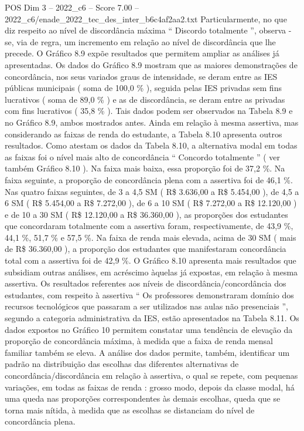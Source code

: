 \begin{textsample}{POS Dim 3 – 2022\_c6 – Score 7.00 – 2022\_c6/enade\_2022\_tec\_des\_inter\_b6c4af2aa2.txt}
Particularmente, no que diz respeito ao nível de discordância máxima “ Discordo totalmente ”, observa -se, via de regra, um incremento em relação ao nível de discordância que lhe precede.
O Gráfico 8.9 expõe resultados que permitem ampliar as análises já apresentadas.
Os dados do Gráfico 8.9 mostram que as maiores demonstrações de concordância, nos seus variados graus de intensidade, se deram entre as IES públicas municipais ( soma de 100,0 \% ), seguida pelas IES privadas sem fins lucrativos ( soma de 89,0 \% ) e as de discordância, se deram entre as privadas com fins lucrativos ( 35,8 \% ).
Tais dados podem ser observados na Tabela 8.9 e no Gráfico 8.9, ambos mostrados antes.
Ainda em relação à mesma assertiva, mas considerando as faixas de renda do estudante, a Tabela 8.10 apresenta outros resultados.
Como atestam os dados da Tabela 8.10, a alternativa modal em todas as faixas foi o nível mais alto de concordância “ Concordo totalmente ” ( ver também Gráfico 8.10 ).
Na faixa mais baixa, essa proporção foi de 37,2 \%.
Na faixa seguinte, a proporção de concordância plena com a assertiva foi de 46,1 \%.
Nas quatro faixas seguintes, de 3 a 4,5 SM ( R\$ 3.636,00 a R\$ 5.454,00 ), de 4,5 a 6 SM ( R\$ 5.454,00 a R\$ 7.272,00 ), de 6 a 10 SM ( R\$ 7.272,00 a R\$ 12.120,00 ) e de 10 a 30 SM ( R\$ 12.120,00 a R\$ 36.360,00 ), as proporções dos estudantes que concordaram totalmente com a assertiva foram, respectivamente, de 43,9 \%, 44,1 \%, 51,7 \% e 57,5 \%.
Na faixa de renda mais elevada, acima de 30 SM ( mais de R\$ 36.360,00 ), a proporção dos estudantes que manifestaram concordância total com a assertiva foi de 42,9 \%.
O Gráfico 8.10 apresenta mais resultados que subsidiam outras análises, em acréscimo àquelas já expostas, em relação à mesma assertiva.
Os resultados referentes aos níveis de discordância/concordância dos estudantes, com respeito à assertiva “ Os professores demonstraram domínio dos recursos tecnológicos que passaram a ser utilizados nas aulas não presenciais ”, segundo a categoria administrativa da IES, estão apresentados na Tabela 8.11.
Os dados expostos no Gráfico 10 permitem constatar uma tendência de elevação da proporção de concordância máxima, à medida que a faixa de renda mensal familiar também se eleva.
A análise dos dados permite, também, identificar um padrão na distribuição das escolhas das diferentes alternativas de concordância/discordância em relação à assertiva, o qual se repete, com pequenas variações, em todas as faixas de renda : grosso modo, depois da classe modal, há uma queda nas proporções correspondentes às demais escolhas, queda que se torna mais nítida, à medida que as escolhas se distanciam do nível de concordância plena.

\end{textsample}
